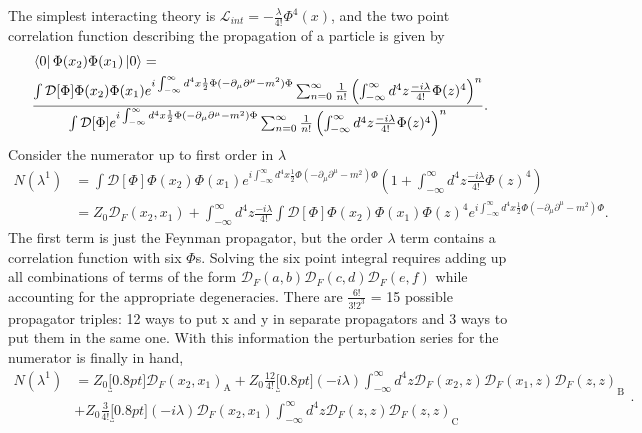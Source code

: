 The simplest interacting theory is $\mathcal{L}_{int} = -\frac{\lambda}{4!}\Phi^4(x)$, and the two point correlation function describing the propagation of a particle is given by
\begin{equation}
\begin{split}
&\bra{0}\Phi(x_2)\Phi(x_1)\ket{0} = \\ 
& \frac{\int \mathcal{D}[\Phi]\Phi(x_2)\Phi(x_1)
e^{i\int_{-\infty}^{\infty} d^4x \frac{1}{2}\Phi (-\partial_\mu\partial^\mu - m^2)\Phi} \sum_{n=0}^{\infty} \frac{1}{n!}\left(\int_{-\infty}^{\infty} d^4z \frac{-i\lambda}{4!}\Phi(z)^4\right)^n}
{\int \mathcal{D}[\Phi]e^{i\int_{-\infty}^{\infty} d^4x \frac{1}{2}\Phi (-\partial_\mu\partial^\mu - m^2)\Phi} \sum_{n=0}^{\infty} \frac{1}{n!}\left(\int_{-\infty}^{\infty} d^4z \frac{-i\lambda}{4!}\Phi(z)^4 \right)^n }.
\end{split}
\end{equation}
Consider the numerator up to first order in $\lambda$
\begin{equation}
\begin{split}
N(\lambda^1) &= \int \mathcal{D}[\Phi]\Phi(x_2)\Phi(x_1)
e^{i\int_{-\infty}^{\infty} d^4x \frac{1}{2}\Phi (-\partial_\mu\partial^\mu - m^2)\Phi} \left(1 + \int_{-\infty}^{\infty} d^4z \frac{-i\lambda}{4!}\Phi(z)^4\right) \\
&=  Z_0\mathcal{D}_F(x_2,x_1) +  
\int_{-\infty}^{\infty} d^4z \frac{-i\lambda}{4!} \int \mathcal{D}[\Phi]\Phi(x_2)\Phi(x_1)\Phi(z)^4e^{i\int_{-\infty}^{\infty} d^4x \frac{1}{2}\Phi (-\partial_\mu\partial^\mu - m^2)\Phi}.
\end{split}
\end{equation}
The first term is just the Feynman propagator, but the order $\lambda$ term contains a correlation function with six $\Phi$s. Solving the six point integral requires adding up all combinations of terms of the form $\mathcal{D}_F(a,b) \mathcal{D}_F(c,d) \mathcal{D}_F(e,f)$ while accounting for the appropriate degeneracies. There are $\frac{6!}{3!2^3}$ = 15 possible propagator triples: 12 ways to put x and y in separate propagators and 3 ways to put them in the same one. With this information the perturbation series for the numerator is finally in hand, 
\begin{equation}
\begin{split}
N(\lambda^1) &= Z_0\underbracket[0.8pt]{\mathcal{D}_F(x_2,x_1)}_\text{A} 
+ Z_0\frac{12}{4!} \underbracket[0.8pt]{(-i\lambda)\int_{-\infty}^{\infty} d^4z \mathcal{D}_F(x_2,z) \mathcal{D}_F(x_1,z) \mathcal{D}_F(z,z)}_\text{B} \\ 
&+ Z_0\frac{3}{4!}\underbracket[0.8pt]{(-i\lambda)\mathcal{D}_F(x_2,x_1) \int_{-\infty}^{\infty} d^4z \mathcal{D}_F(z,z) \mathcal{D}_F(z,z)}_\text{C} 
\end{split}.
\end{equation} 

